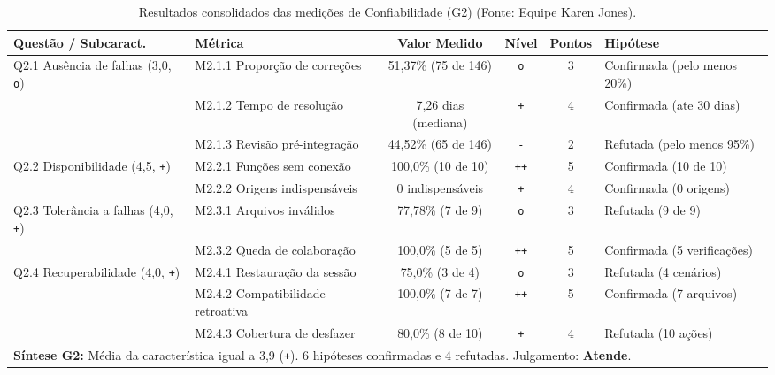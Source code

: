 \documentclass[12pt]{article}
\renewcommand{\arraystretch}{0.9}
\begin{document}
\begin{table}[!ht]
\centering
\caption{Resultados consolidados das medições de Confiabilidade (G2) (Fonte: Equipe Karen Jones).}
\label{tab:resultados_g2}
\vspace{2pt}
\scriptsize
\setlength{\tabcolsep}{2.5pt}
\renewcommand{\arraystretch}{0.85}
\begin{tabular}{llcccl}
\toprule
\textbf{Questão / Subcaract.} & \textbf{Métrica} & \textbf{Valor Medido} & \textbf{Nível} & \textbf{Pontos} & \textbf{Hipótese} \\
\midrule
Q2.1 Ausência de falhas (3,0, \texttt{o}) & M2.1.1 Proporção de correções & 51,37\% (75 de 146) & \texttt{o} & 3 & Confirmada (pelo menos 20\%) \\
 & M2.1.2 Tempo de resolução & 7,26 dias (mediana) & \texttt{+} & 4 & Confirmada (ate 30 dias) \\
 & M2.1.3 Revisão pré-integração & 44,52\% (65 de 146) & \texttt{-} & 2 & Refutada (pelo menos 95\%) \\
\midrule
Q2.2 Disponibilidade (4,5, \texttt{+}) & M2.2.1 Funções sem conexão & 100,0\% (10 de 10) & \texttt{++} & 5 & Confirmada (10 de 10) \\
 & M2.2.2 Origens indispensáveis & 0 indispensáveis & \texttt{+} & 4 & Confirmada (0 origens) \\
\midrule
Q2.3 Tolerância a falhas (4,0, \texttt{+}) & M2.3.1 Arquivos inválidos & 77,78\% (7 de 9) & \texttt{o} & 3 & Refutada (9 de 9) \\
 & M2.3.2 Queda de colaboração & 100,0\% (5 de 5) & \texttt{++} & 5 & Confirmada (5 verificações) \\
\midrule
Q2.4 Recuperabilidade (4,0, \texttt{+}) & M2.4.1 Restauração da sessão & 75,0\% (3 de 4) & \texttt{o} & 3 & Refutada (4 cenários) \\
 & M2.4.2 Compatibilidade retroativa & 100,0\% (7 de 7) & \texttt{++} & 5 & Confirmada (7 arquivos) \\
 & M2.4.3 Cobertura de desfazer & 80,0\% (8 de 10) & \texttt{+} & 4 & Refutada (10 ações) \\
\midrule
\multicolumn{6}{p{14.6cm}}{\textbf{Síntese G2:} Média da característica igual a 3,9 (\texttt{+}). 6 hipóteses confirmadas e 4 refutadas. Julgamento: \textbf{Atende}.} \\
\bottomrule
\end{tabular}
\end{table}
\end{document}
